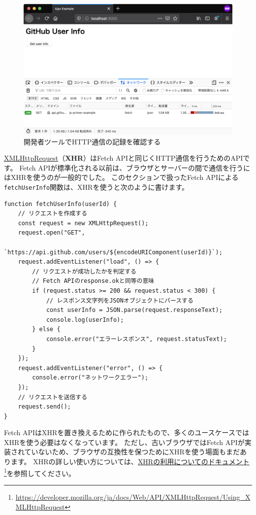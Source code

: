 \begin{figure}[h]
\centering
\includegraphics[width=120mm]{fig/fig-3.png}
\caption{開発者ツールでHTTP通信の記録を確認する}
\end{figure}

\begin{tcolorbox}[title=XMLHttpRequest]\label{xhr}

\href{https://developer.mozilla.org/ja/docs/Web/API/XMLHttpRequest}{XMLHttpRequest}（\textbf{XHR}）はFetch
APIと同じくHTTP通信を行うためのAPIです。 Fetch
APIが標準化される以前は、ブラウザとサーバーの間で通信を行うにはXHRを使うのが一般的でした。
このセクションで扱ったFetch
APIによる\texttt{fetchUserInfo}関数は、XHRを使うと次のように書けます。

\begin{lstlisting}
function fetchUserInfo(userId) {
    // リクエストを作成する
    const request = new XMLHttpRequest();
    request.open("GET", 
            `https://api.github.com/users/${encodeURIComponent(userId)}`);
    request.addEventListener("load", () => {
        // リクエストが成功したかを判定する
        // Fetch APIのresponse.okと同等の意味
        if (request.status >= 200 && request.status < 300) {
            // レスポンス文字列をJSONオブジェクトにパースする
            const userInfo = JSON.parse(request.responseText);
            console.log(userInfo);
        } else {
            console.error("エラーレスポンス", request.statusText);
        }
    });
    request.addEventListener("error", () => {
        console.error("ネットワークエラー");
    });
    // リクエストを送信する
    request.send();
}
\end{lstlisting}

Fetch
APIはXHRを置き換えるために作られたもので、多くのユースケースではXHRを使う必要はなくなっています。
ただし、古いブラウザではFetch
APIが実装されていないため、ブラウザの互換性を保つためにXHRを使う場面もまだあります。
XHRの詳しい使い方については、\href{https://developer.mozilla.org/ja/docs/Web/API/XMLHttpRequest/Using_XMLHttpRequest}{XHRの利用についてのドキュメント}\footnote{\url{https://developer.mozilla.org/ja/docs/Web/API/XMLHttpRequest/Using_XMLHttpRequest}}を参照してください。
\end{tcolorbox}

